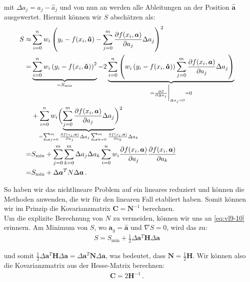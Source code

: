 mit $\Delta a_j = a_j - \hat{a}_j$ und von nun an werden alle Ableitungen an der Position $\boldsymbol{\hat{a}}$ ausgewertet. Hiermit k\"onnen wir $S$ absch\"atzen als:
\begin{align}
\begin{split}
S \approx& \sum_{i=0}^n w_i \left( y_i - f(x_i, \boldsymbol{\hat{a}}) - \sum_{j=0}^m \frac{ \partial f(x_i, \boldsymbol{a}) }{ \partial a_j } \Delta a_j \right)^2\\
=& \underbrace{\sum_{i=0}^n w_i \left( y_i - f(x_i, \boldsymbol{\hat{a}}) \right)^2}_{= S_\text{min}} - 2 \underbrace{\sum_{i=0}^n \left( w_i \left( y_i - f(x_i, \boldsymbol{\hat{a}}) \right) \sum_{j=0}^m \frac{ \partial f(x_i, \boldsymbol{a}) }{ \partial a_j } \Delta a_j \right)}_{= \frac{ \partial S }{ \partial \Delta a_j} \bigg|_{\Delta a_j = 0} = 0}\\
&+ \sum_{i=0}^n w_i \biggl( {\underbrace{\sum_{j=0}^m \frac{ \partial f(x_i, \boldsymbol{a}) }{ \partial a_j } \Delta a_j}_{\mathclap{= \sum_{j=0}^m \frac{ \partial f(x_i, \boldsymbol{a}) }{ \partial a_j } \Delta a_j \sum_{k=0}^m \frac{ \partial f(x_i, \boldsymbol{a}) }{ \partial a_k } \Delta a_k}}} \biggr)^2\\
=& S_\text{min} + \sum_{j=0}^m \sum_{k=0}^m \Delta a_j \Delta a_k \sum_{i=0}^n w_i \frac{ \partial f(x_i, \boldsymbol{a}) }{ \partial a_j } \frac{ \partial f(x_i, \boldsymbol{a}) }{ \partial a_k }\\
=& S_\text{min} + \Delta \boldsymbol{a}^T N \Delta \boldsymbol{a}\,.
\label{eq:vl9-21}
\end{split}
\end{align}

So haben wir das nichtlineare Problem auf ein lineares reduziert und k\"onnen die Methoden anwenden, die wir f\"ur den linearen Fall etabliert haben. Somit k\"onnen wir im Prinzip die Kovarianzmatrix $\boldsymbol{C} = \boldsymbol{N}^{-1}$ berechnen.\\[0.3cm]
Um die explizite Berechnung von $N$ zu vermeiden, k\"onnen wir uns an \cref{eq:vl9-10} erinnern. Am Minimum von $S$, wo $\boldsymbol{a}_g = \boldsymbol{\hat{a}}$ und $\nabla S = 0$, wird das zu:
\begin{align}
S = S_\text{min} + \frac{1}{2} \Delta \boldsymbol{a}^T \boldsymbol{H} \Delta \boldsymbol{a}
\label{eq:vl9-22}
\end{align}

und somit $\frac{1}{2} \Delta \boldsymbol{a}^T \boldsymbol{H} \Delta \boldsymbol{a} = \Delta \boldsymbol{a}^T \boldsymbol{N} \Delta \boldsymbol{a}$, was bedeutet, dass $\boldsymbol{N} = \frac{1}{2} \boldsymbol{H}$. Wir k\"onnen also die Kovarianzmatrix aus der Hesse-Matrix berechnen:
\begin{align}
\boldsymbol{C} = 2 \boldsymbol{H}^{-1}\,.
\label{eq:vl9-23}
\end{align}

